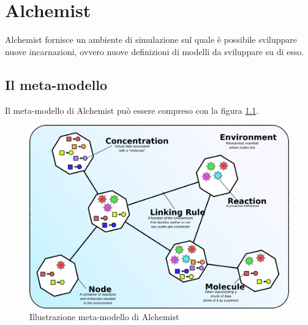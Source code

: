 \documentclass[12pt,a4paper,openright,twoside]{report}
\begin{document}
\clearpage{\pagestyle{empty}\cleardoublepage}

\listoffigures

\clearpage{\pagestyle{empty}\cleardoublepage}


\clearpage{\pagestyle{empty}\cleardoublepage}

\chapter{Alchemist}
\lhead[\fancyplain{}{\bfseries\thepage}]{\fancyplain{}{\bfseries\rightmark}}
Alchemist fornisce un ambiente di simulazione sul quale \`e possibile sviluppare nuove incarnazioni, ovvero nuove definizioni di modelli da sviluppare su di esso.

\section{Il meta-modello}
Il meta-modello di Alchemist pu\`o essere compreso con la figura \ref{fig:alchemistModel}.
\begin{figure}[h] %
\begin{center} %
\includegraphics[width=12.5cm]{images/model.png} %
\caption[Illustrazione meta-modello di Alchemist]{Illustrazione meta-modello di Alchemist} \label{fig:alchemistModel}
\end{center}
\end{figure}
\end{document}
